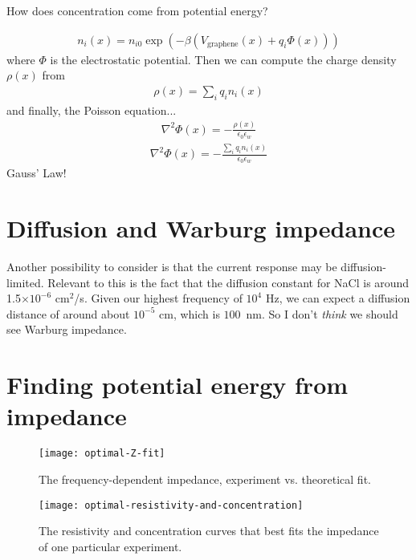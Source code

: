 \documentclass[twocolumn]{revtex4-1}
\begin{document}
How does concentration come from potential energy?

\begin{align}
  n_i(x) = n_{i0} \exp\left(-\beta \left(V_{\text{graphene}}(x)
                                       + q_i \Phi(x)\right)\right)
\end{align}
where $\Phi$ is the electrostatic potential.  Then we can compute the
charge density $\rho(x)$ from
\begin{align}
  \rho(x) = \sum_i q_i n_i(x)
\end{align}
and finally, the Poisson equation...
\begin{align}
  \nabla^2 \Phi(x) = -\frac{\rho(x)}{\epsilon_0\epsilon_w}
\end{align}
\begin{align}
  \nabla^2 \Phi(x) = -\frac{\sum_i q_i n_i(x)}{\epsilon_0\epsilon_w}
\end{align}
Gauss' Law!


\section{Diffusion and Warburg impedance}

Another possibility to consider is that the current response may be
diffusion-limited.  Relevant to this is the fact that the diffusion
constant for NaCl is around 1.5$\times 10^{-6}$ cm$^2$/s.  Given our
highest frequency of $10^4$ Hz, we can expect a diffusion distance of
around about $10^{-5}$ cm, which is $100$~nm.  So I don't \emph{think}
we should see Warburg impedance.


\clearpage

\section{Finding potential energy from impedance}

\begin{figure}
  \texttt{[image: optimal-Z-fit]}
  \caption{The frequency-dependent impedance, experiment
    vs. theoretical fit.}\label{fig:optimal-Z-fit}
\end{figure}

\begin{figure}
  \texttt{[image: optimal-resistivity-and-concentration]}
  \caption{The resistivity and concentration curves that best fits the
    impedance of one particular
    experiment.}\label{fig:optimal-resistivity-and-concentration}
\end{figure}
\end{document}

